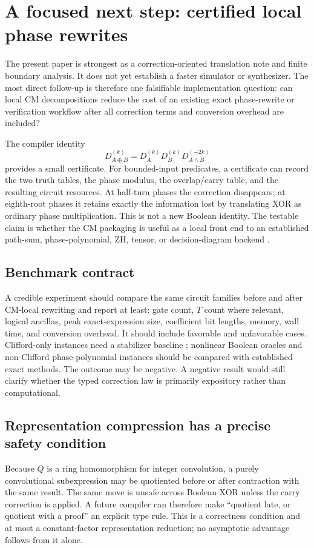 \section{A focused next step: certified local phase rewrites}\label{sec:applications}
The present paper is strongest as a correction-oriented translation note and finite boundary analysis.  It does not yet establish a faster simulator or synthesizer.  The most direct follow-up is therefore one falsifiable implementation question: can local CM decompositions reduce the cost of an existing exact phase-rewrite or verification workflow after all correction terms and conversion overhead are included?

The compiler identity
\begin{equation}
 D_{A\oplus B}^{(k)}=D_A^{(k)}D_B^{(k)}D_{A\land B}^{(-2k)}
\end{equation}
provides a small certificate.  For bounded-input predicates, a certificate can record the two truth tables, the phase modulus, the overlap/carry table, and the resulting circuit resources.  At half-turn phases the correction disappears; at eighth-root phases it retains exactly the information lost by translating XOR as ordinary phase multiplication.  This is not a new Boolean identity.  The testable claim is whether the CM packaging is useful as a local front end to an established path-sum, phase-polynomial, ZH, tensor, or decision-diagram backend \cite{amy2019,amy2023,zh,markov,tdd,mei}.

\subsection{Benchmark contract}
A credible experiment should compare the same circuit families before and after CM-local rewriting and report at least: gate count, $T$ count where relevant, logical ancillas, peak exact-expression size, coefficient bit lengths, memory, wall time, and conversion overhead.  It should include favorable and unfavorable cases.  Clifford-only instances need a stabilizer baseline \cite{aaronson}; nonlinear Boolean oracles and non-Clifford phase-polynomial instances should be compared with established exact methods.  The outcome may be negative.  A negative result would still clarify whether the typed correction law is primarily expository rather than computational.

\subsection{Representation compression has a precise safety condition}
Because $Q$ is a ring homomorphism for integer convolution, a purely convolutional subexpression may be quotiented before or after contraction with the same result.  The same move is unsafe across Boolean XOR unless the carry correction is applied.  A future compiler can therefore make ``quotient late, or quotient with a proof'' an explicit type rule.  This is a correctness condition and at most a constant-factor representation reduction; no asymptotic advantage follows from it alone.

